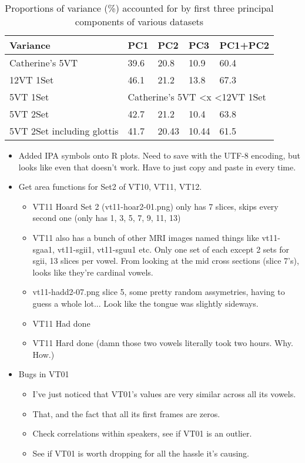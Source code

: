 \documentclass{article}
\begin{document}
\begin{table}[]
\centering
\caption{Proportions of variance (\%) accounted for by first three principal components of various datasets}
\label{my-label}
\begin{tabular}{|l|l|l|l|l|}
\hline
\textbf{Variance} & \textbf{PC1}   & \textbf{PC2}   & \textbf{PC3}   & \textbf{PC1+PC2}  \\ \hline
Catherine's 5VT   & 39.6           & 20.8           & 10.9           & 60.4              \\ \hline
12VT 1Set         & 46.1           & 21.2           & 13.8           & 67.3              \\ \hline
5VT 1Set          & \multicolumn{4}{l|}{Catherine's 5VT \textless x \textless 12VT 1Set} \\ \hline
5VT 2Set          & 42.7           & 21.2           & 10.4           & 63.8              \\ \hline
5VT 2Set including glottis      & 41.7           & 20.43           & 10.44           & 61.5              \\ \hline
\end{tabular}
\end{table}

\begin{itemize}
    \item Added IPA symbols onto R plots. Need to save with the UTF-8 encoding, but looks like even that doesn't work. Have to just copy and paste in every time. 
    \item Get area functions for Set2 of VT10, VT11, VT12.
    \begin{itemize}
        \item VT11 Hoard Set 2 (vt11-hoar2-01.png) only has 7 slices, skips every second one (only has 1, 3, 5, 7, 9, 11, 13)
        \item VT11 also has a bunch of other MRI images named things like vt11-sgaa1, vt11-sgii1, vt11-sguu1 etc. Only one set of each except 2 sets for sgii, 13 slices per vowel. From looking at the mid cross sections (slice 7's), looks like they're cardinal vowels.
        \item vt11-hadd2-07.png slice 5, some pretty random assymetries, having to guess a whole lot... Look like the tongue was slightly sideways.
        \item VT11 Had done
        \item VT11 Hard done (damn those two vowels literally took two hours. Why. How.)
    \end{itemize}
    \item Bugs in VT01
    \begin{itemize}
        \item I've just noticed that VT01's values are very similar across all its vowels.
        \item That, and the fact that all its first frames are zeros.
        \item Check correlations within speakers, see if VT01 is an outlier.
        \item See if VT01 is worth dropping for all the hassle it's causing.
    \end{itemize}
\end{itemize}
\end{document}
